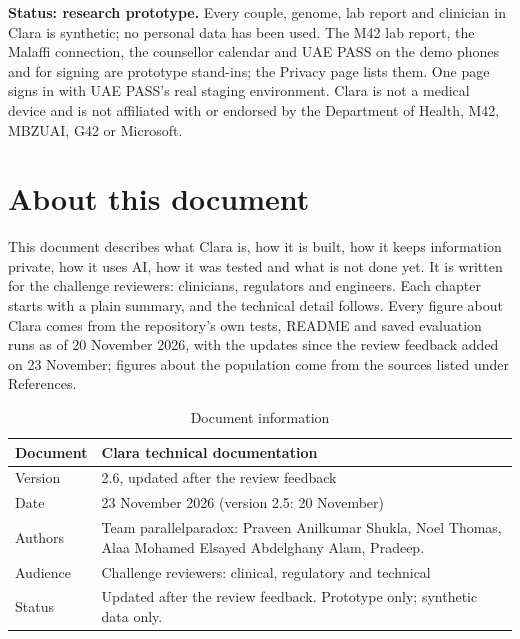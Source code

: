 \documentclass[10.5pt,a4paper]{article}
\newcommand{\chapterbreak}{}
\let\oldsection\section
\renewcommand{\section}{\chapterbreak\oldsection}
\newcommand{\toprl}{\arrayrulecolor{ink}\toprule\arrayrulecolor{rule}}
\begin{document}
\begin{titlepage}
\vfill
\begin{note}[colback=white,colframe=rule,boxrule=0.6pt]
\textbf{Status: research prototype.} Every couple, genome, lab report and clinician in Clara is synthetic; no personal
data has been used. The M42 lab report, the Malaffi connection, the counsellor calendar and UAE PASS on the demo phones and for signing are prototype stand-ins; the Privacy page lists them. One page signs in with UAE PASS's real staging environment. Clara is not a medical device and is not
affiliated with or endorsed by the Department of Health, M42, MBZUAI, G42 or Microsoft.
\end{note}
\end{titlepage}

\setcounter{page}{2}
\section*{About this document}

This document describes what Clara is, how it is built, how it keeps information private, how it uses AI, how it was
tested and what is not done yet. It is written for the challenge reviewers: clinicians, regulators and engineers. Each
chapter starts with a plain summary, and the technical detail follows. Every figure about Clara comes from the repository's
own tests, README and saved evaluation runs as of 20 November 2026, with the updates since the review feedback added on 23 November; figures about the population come from the
sources listed under References.

{
\begin{xltabular}{\textwidth}{@{}P{3.6cm}L@{}}
\caption{Document information}\\
\toprl
Document & Clara technical documentation\\
\midrule
Version & 2.6, updated after the review feedback\\
\midrule
Date & 23 November 2026 (version 2.5: 20 November)\\
\midrule
Authors & Team parallelparadox: Praveen Anilkumar Shukla, Noel Thomas, Alaa Mohamed Elsayed Abdelghany Alam, Pradeep.\\
\midrule
Audience & Challenge reviewers: clinical, regulatory and technical\\
\midrule
Status & Updated after the review feedback. Prototype only; synthetic data only.\\
\bottomrule
\end{xltabular}}
\end{document}
